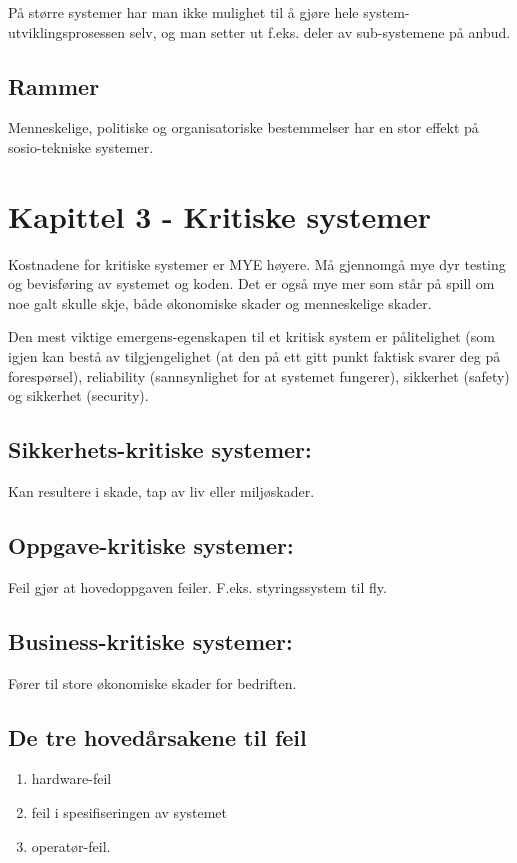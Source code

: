 \documentclass[11pt]{article}
\begin{document}
    På større systemer har man ikke mulighet til å gjøre hele system-utviklingsprosessen selv, og man setter 
    ut f.eks. deler av sub-systemene på anbud.
\subsection{Rammer}
\label{sec-2.5}

   Menneskelige, politiske og organisatoriske bestemmelser har en stor effekt på sosio-tekniske systemer.
\section{Kapittel 3 - Kritiske systemer}
\label{sec-3}

  Kostnadene for kritiske systemer er MYE høyere. 
  Må gjennomgå mye dyr testing og bevisføring av systemet og koden.
  Det er også mye mer som står på spill om noe galt skulle skje, både økonomiske skader og menneskelige skader.

  Den mest viktige emergens-egenskapen til et kritisk system er pålitelighet 
  (som igjen kan bestå av tilgjengelighet (at den på ett gitt punkt faktisk svarer 
  deg på forespørsel), reliability (sannsynlighet for at systemet fungerer), 
  sikkerhet (safety) og sikkerhet (security). 
\subsection{Sikkerhets-kritiske systemer:}
\label{sec-3.1}

   Kan resultere i skade, tap av liv eller miljøskader.
\subsection{Oppgave-kritiske systemer:}
\label{sec-3.2}

   Feil gjør at hovedoppgaven feiler. F.eks. styringssystem til fly.
\subsection{Business-kritiske systemer:}
\label{sec-3.3}

   Fører til store økonomiske skader for bedriften.
\subsection{De tre hovedårsakene til feil}
\label{sec-3.4}

\begin{enumerate}
\item hardware-feil
\item feil i spesifiseringen av systemet
\item operatør-feil.
\end{enumerate}
\end{document}
